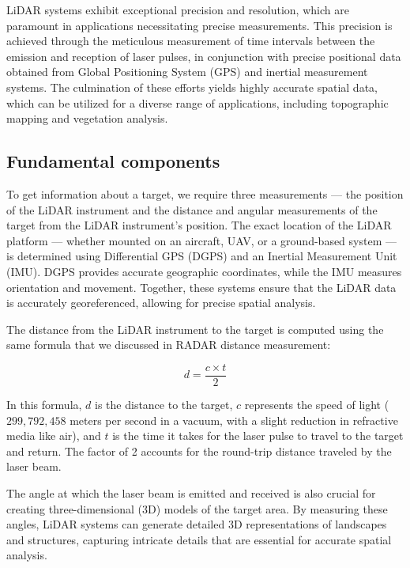 \documentclass[
  12 pt,
]{Nemilov}
\begin{document}
LiDAR systems exhibit exceptional precision and resolution, which are paramount in applications necessitating precise measurements. This precision is achieved through the meticulous measurement of time intervals between the emission and reception of laser pulses, in conjunction with precise positional data obtained from Global Positioning System (GPS) and inertial measurement systems. The culmination of these efforts yields highly accurate spatial data, which can be utilized for a diverse range of applications, including topographic mapping and vegetation analysis.

\subsection{Fundamental components}\label{fundamental-components}

To get information about a target, we require three measurements --- the position of the LiDAR instrument and the distance and angular measurements of the target from the LiDAR instrument's position. The exact location of the LiDAR platform --- whether mounted on an aircraft, UAV, or a ground-based system --- is determined using Differential GPS (DGPS) and an Inertial Measurement Unit (IMU). DGPS provides accurate geographic coordinates, while the IMU measures orientation and movement. Together, these systems ensure that the LiDAR data is accurately georeferenced, allowing for precise spatial analysis.

The distance from the LiDAR instrument to the target is computed using the same formula that we discussed in RADAR distance measurement:

\[ d = \frac{c \times t}{2} \]

In this formula, \(d\) is the distance to the target, \(c\) represents the speed of light (\(299,792,458\) meters per second in a vacuum, with a slight reduction in refractive media like air), and \(t\) is the time it takes for the laser pulse to travel to the target and return. The factor of 2 accounts for the round-trip distance traveled by the laser beam.

The angle at which the laser beam is emitted and received is also crucial for creating three-dimensional (3D) models of the target area. By measuring these angles, LiDAR systems can generate detailed 3D representations of landscapes and structures, capturing intricate details that are essential for accurate spatial analysis.
\end{document}
